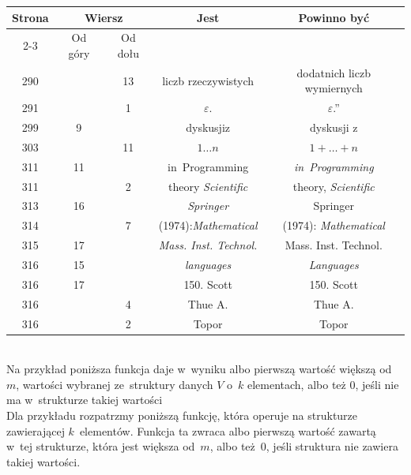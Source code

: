 \documentclass[a4paper,11pt]{article}
\numberwithin{equation}{section}
\begin{document}
\begin{center}

  \begin{tabular}{|c|c|c|c|c|}
    \hline
    Strona & \multicolumn{2}{c|}{Wiersz} & Jest
    & Powinno być \\ \cline{2-3}
           & Od góry & Od dołu & & \\
    \hline
    290 & & 13 & liczb rzeczywistych & dodatnich liczb wymiernych \\
    291 & & \hphantom{0}1 & $\varepsilon$. & $\varepsilon$.” \\
    299 & \hphantom{0}9 & & dyskusjiz & dyskusji z \\
    303 & & 11 & $1 \ldots n$ & $1 + \ldots + n$ \\
    311 & 11 & & in~Programming & \textit{in~Programming} \\
    311 & & \hphantom{0}2 & theory \textit{Scientific}
           & theory, \textit{Scientific} \\
    313 & 16 & & \textit{Springer} & Springer \\
    314 & & \hphantom{0}7 & (1974):\textit{Mathematical}
           & (1974): \textit{Mathematical} \\
    315 & 17 & & \textit{Mass. Inst. Technol.}
           & Mass. Inst. Technol. \\
    316 & 15 & & \textit{languages} & \textit{Languages} \\
    316 & 17 & & 150.{ }{ } Scott & 150. Scott \\
    316 & & \hphantom{0}4 & Thue{ }{ } A. & Thue A. \\
    316 & & \hphantom{0}2 & Top\hspace{0.2em}or & Topor \\
    \hline
  \end{tabular}

\end{center}

\VerSpaceSix





\noindent
{} \\
\Jest Na przykład poniższa funkcja daje w~wyniku albo pierwszą wartość
większą od $m$, wartości wybranej ze~struktury danych $V$ o~$k$ elementach,
albo też $0$, jeśli nie ma w~strukturze takiej wartości \\
\PowinnoByc Dla przykładu rozpatrzmy poniższą funkcję, która operuje
na strukturze zawierającej $k$~elementów. Funkcja ta zwraca albo pierwszą
wartość zawartą w~tej strukturze, która jest większa od~$m$, albo też~$0$,
jeśli struktura nie zawiera takiej wartości. \\
\end{document}

